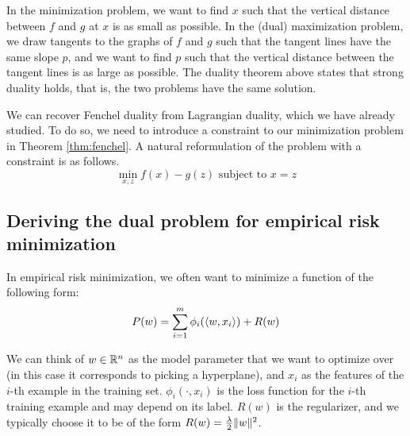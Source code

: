 In the minimization problem, we want to find $x$ such that the vertical distance between $f$ and $g$ at $x$ is as small as possible. In the (dual) maximization problem, we draw tangents to the graphs of $f$ and $g$ such that the tangent lines have the same slope $p$, and we want to find $p$ such that the vertical distance between the tangent lines is as large as possible. The duality theorem above states that strong duality holds, that is, the two problems have the same solution.

We can recover Fenchel duality from Lagrangian duality, which we have already studied. To do so, we need to introduce a constraint to our minimization problem in Theorem \ref{thm:fenchel}. A natural reformulation of the problem with a constraint is as follows.
\begin{equation}
    \min_{x,z} f(x)-g(z) \text{ subject to } x=z
\end{equation}



\subsection{Deriving the dual problem for empirical risk minimization}
In empirical risk minimization, we often want to minimize a function of the following form:
\begin{equation}
    P(w) = \sum_{i=1}^m \phi_i(\langle w,x_i\rangle) + R(w)
\end{equation}

We can think of $w \in \mathbb{R}^n$ as the model parameter that we want to optimize over (in this case it corresponds to picking a hyperplane), and $x_i$ as the features of the $i$-th example in the training set. $\phi_i(\cdot, x_i)$ is the loss function for the $i$-th training example and may depend on its label. $R(w)$ is the regularizer, and we typically choose it to be of the form $R(w) = \frac{\lambda}{2}\lVert w\rVert^2$.

